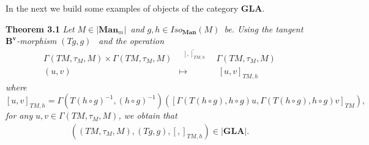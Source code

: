 \documentclass[11pt]{article}
\begin{document}
In the next we build some examples of objects of the category $\mathbf{GLA.}$

\textbf{Theorem 3.1} \emph{Let }$M\in \left\vert \mathbf{Man}_{m}\right\vert
$\emph{\ and }$g,h\in Iso_{\mathbf{Man}}\left( M\right) $\emph{\ be. Using
the tangent }$\mathbf{B}^{\mathbf{v}}$\emph{-morphism }$\left( Tg,g\right) $%
\emph{\ and the operation }%
\begin{equation*}
\begin{array}{ccc}
\Gamma \left( TM,\tau _{M},M\right) \times \Gamma \left( TM,\tau
_{M},M\right) & ^{\underrightarrow{~\ \ \left[ ,\right] _{TM,h}~\ \ }} &
\Gamma \left( TM,\tau _{M},M\right) \\
\left( u,v\right) & \longmapsto & \ \left[ u,v\right] _{TM,h}%
\end{array}%
\end{equation*}%
\emph{where }%
\begin{equation*}
\left[ u,v\right] _{TM,h}=\Gamma \left( T\left( h\circ g\right) ^{-1},\left(
h\circ g\right) ^{-1}\right) \left( \left[ \Gamma \left( T\left( h\circ
g\right) ,h\circ g\right) u,\Gamma \left( T\left( h\circ g\right) ,h\circ
g\right) v\right] _{TM}\right) ,
\end{equation*}%
\emph{for any }$u,v\in \Gamma \left( TM,\tau _{M},M\right) $\emph{, we
obtain that}%
\begin{equation*}
\begin{array}{c}
\left( \left( TM,\tau _{M},M\right) ,\left( Tg,g\right) ,\left[ ,\right]
_{TM,h}\right) \in \left\vert \mathbf{GLA}\right\vert .%
\end{array}%
\end{equation*}
\end{document}
